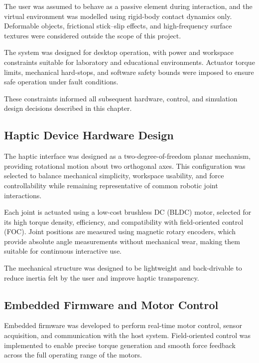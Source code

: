 The user was assumed to behave as a passive element during interaction, and the virtual environment was modelled using rigid-body contact dynamics only. Deformable objects, frictional stick--slip effects, and high-frequency surface textures were considered outside the scope of this project.

The system was designed for desktop operation, with power and workspace constraints suitable for laboratory and educational environments. Actuator torque limits, mechanical hard-stops, and software safety bounds were imposed to ensure safe operation under fault conditions.

These constraints informed all subsequent hardware, control, and simulation design decisions described in this chapter.

\subsection{Haptic Device Hardware Design}

The haptic interface was designed as a two-degree-of-freedom planar mechanism, providing rotational motion about two orthogonal axes. This configuration was selected to balance mechanical simplicity, workspace usability, and force controllability while remaining representative of common robotic joint interactions.

Each joint is actuated using a low-cost brushless DC (BLDC) motor, selected for its high torque density, efficiency, and compatibility with field-oriented control (FOC). Joint positions are measured using magnetic rotary encoders, which provide absolute angle measurements without mechanical wear, making them suitable for continuous interactive use.

The mechanical structure was designed to be lightweight and back-drivable to reduce inertia felt by the user and improve haptic transparency. %

\subsection{Embedded Firmware and Motor Control}

Embedded firmware was developed to perform real-time motor control, sensor acquisition, and communication with the host system. Field-oriented control was implemented to enable precise torque generation and smooth force feedback across the full operating range of the motors.

